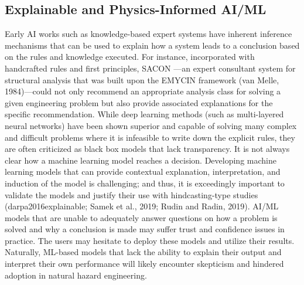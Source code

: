 \subsection{Explainable and Physics-Informed AI/ML}

Early AI works such as knowledge-based expert systems have inherent inference mechanisms that can be used to explain how a system leads to a conclusion based on the rules and knowledge executed. For instance, incorporated with handcrafted rules and first principles, SACON \citep{bennett1978sacon}—an expert consultant system for structural analysis that was built upon the EMYCIN framework (van Melle, 1984)—could not only recommend an appropriate analysis class for solving a given engineering problem but also provide associated explanations for the specific recommendation. While deep learning methods (such as multi-layered neural networks) have been shown superior and capable of solving many complex and difficult problems where it is infeasible to write down the explicit rules, they are often criticized as black box models that lack transparency. It is not always clear how a machine learning model reaches a decision. Developing machine learning models that can provide contextual explanation, interpretation, and induction of the model is challenging; and thus, it is exceedingly important to validate the models and justify their use with hindcasting-type studies (darpa2016explainable; Samek et al., 2019; Rudin and Radin, 2019). AI/ML models that are unable to adequately answer questions on how a problem is solved and why a conclusion is made may suffer trust and confidence issues in practice. The users may hesitate to deploy these models and utilize their results. Naturally, ML-based models that lack the ability to explain their output and interpret their own performance will likely encounter skepticism and hindered adoption in natural hazard engineering. 

